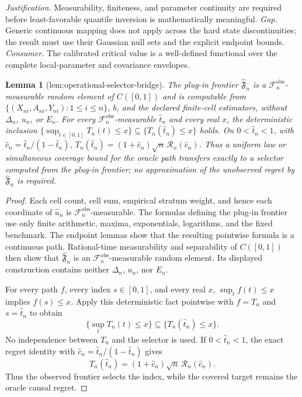 \documentclass{article}
\newtheorem{lemma}{Lemma}
\begin{document}
\par\smallskip\noindent \textit{Justification.} Measurability, finiteness, and parameter continuity are required before least-favorable quantile inversion is mathematically meaningful. \textit{Gap.} Generic continuous mapping does not apply across the hard state discontinuities; the result must use their Gaussian null sets and the explicit endpoint bounds. \textit{Consumer.} The calibrated critical value is a well-defined functional over the complete local-parameter and covariance envelopes.

\begin{lemma}[lem:operational-selector-bridge]\label{lem:operational-selector-bridge}
The plug-in frontier \(\widehat{\mathfrak F}_n\) is a \(\mathcal F_n^{\mathrm{obs}}\)-measurable random element of \(C([0,1])\) and is computable from \(\{(X_{ni},A_{ni},Y_{ni}):1\le i\le n\}\), \(b\), and the declared finite-cell estimators, without \(\Delta_n\), \(u_n\), or \(E_n\). For every \(\mathcal F_n^{\mathrm{obs}}\)-measurable \(\widehat t_n\) and every real \(x\), the deterministic inclusion \(\{\sup_{t\in[0,1]}T_n(t)\le x\}\subseteq\{T_n(\widehat t_n)\le x\}\) holds. On \(0<\widehat t_n<1\), with \(\widehat c_n=\widehat t_n/(1-\widehat t_n)\), \(T_n(\widehat t_n)=(1+\widehat c_n)\sqrt n\,\mathscr R_n(\widehat c_n)\). Thus a uniform law or simultaneous coverage bound for the oracle path transfers exactly to a selector computed from the plug-in frontier; no approximation of the unobserved regret by \(\widehat{\mathfrak F}_n\) is required.
\end{lemma}
\begin{proof}
Each cell count, cell sum, empirical stratum weight, and hence each coordinate of \(\widehat u_n\) is \(\mathcal F_n^{\mathrm{obs}}\)-measurable.  The formulas defining the plug-in frontier use only finite arithmetic, maxima, exponentials, logarithms, and the fixed benchmark.  The endpoint lemmas show that the resulting pointwise formula is a continuous path.  Rational-time measurability and separability of \(C([0,1])\) then show that \(\widehat{\mathfrak F}_n\) is an \(\mathcal F_n^{\mathrm{obs}}\)-measurable random element.  Its displayed construction contains neither \(\Delta_n\), \(u_n\), nor \(E_n\).

For every path \(f\), every index \(s\in[0,1]\), and every real \(x\), \(\sup_tf(t)\le x\) implies \(f(s)\le x\).  Apply this deterministic fact pointwise with \(f=T_n\) and \(s=\widehat t_n\) to obtain
\[
 \{\sup_tT_n(t)\le x\}\subseteq\{T_n(\widehat t_n)\le x\}.
\]
No independence between \(T_n\) and the selector is used.  If \(0<\widehat t_n<1\), the exact regret identity with \(\widehat c_n=\widehat t_n/(1-\widehat t_n)\) gives
\[
 T_n(\widehat t_n)=(1+\widehat c_n)\sqrt n\,\mathscr R_n(\widehat c_n).
\]
Thus the observed frontier selects the index, while the covered target remains the oracle causal regret.
\end{proof}
\end{document}
